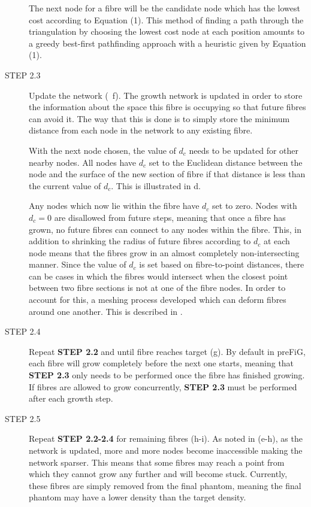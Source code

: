 \begin{description}
The next node for a fibre will be the candidate node which has the lowest cost according to Equation (1). This method of finding a path through the triangulation by choosing the lowest cost node at each position amounts to a greedy best-first pathfinding approach with a heuristic given by Equation (1).

  \item [STEP 2.3] Update the network (~f). The growth network is updated in order to store the information about the space this fibre is occupying so that future fibres can avoid it. The way that this is done is to simply store the minimum distance from each node in the network to any existing fibre.

With the next node chosen, the value of $d_c$ needs to be updated for other nearby nodes.
All nodes have $d_c$ set to the Euclidean distance between the node and the surface of the new section of fibre if that distance is less than the current value of $d_c$. This is illustrated in d.

Any nodes which now lie within the fibre have $d_c$ set to zero.
Nodes with $d_c = 0$ are disallowed from future steps, meaning that once a fibre has grown, no future fibres can connect to any nodes within the fibre.
This, in addition to shrinking the radius of future fibres according to $d_c$ at each node means that the fibres grow in an almost completely  non-intersecting manner.
Since the value of $d_c$ is set based on fibre-to-point distances, there can be cases in which the fibres would intersect when the closest point between two fibre sections is not at one of the fibre nodes.
In order to account for this, a meshing process developed which can deform fibres around one another. This is described in .

  \item [STEP 2.4] Repeat \textbf{\sffamily STEP 2.2} and \textbf{} until fibre reaches target (g). By default in \ac{preFiG}, each fibre will grow completely before the next one starts, meaning that \textbf{\sffamily STEP 2.3} only needs to be performed once the fibre has finished growing. If fibres are allowed to grow concurrently, \textbf{\sffamily STEP 2.3} must be performed after each growth step.

  \item [STEP 2.5] Repeat \textbf{\sffamily STEP 2.2-2.4} for remaining fibres (h-i). As noted in  (e-h), as the network is updated, more and more nodes become inaccessible making the network sparser. This means that some fibres may reach a point from which they cannot grow any further and will become stuck. Currently, these fibres are simply removed from the final phantom, meaning the final phantom may have a lower density than the target density.
\end{description}



